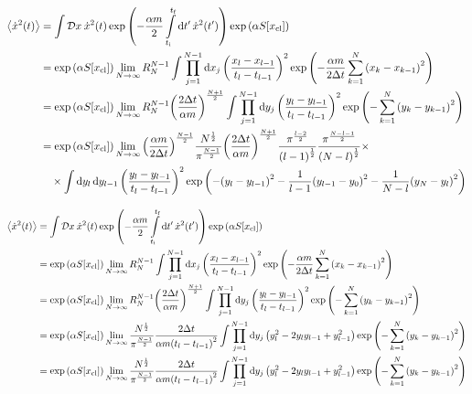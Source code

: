 \documentclass[twoside]{amsart}
\newcommand{\Dd}[1]{\mathcal D #1\: }
\numberwithin{equation}{section}
\begin{document}
\begin{align*}
    \expval{\dot x^2\qty(t)}&=\int\Dd x\dot x^2\qty(t)\exp\qty(-\frac{\alpha m}{2}\int\limits_{t_{\textnormal i}}^{t_{\textnormal f}}\dd{t'}\dot x^2\qty(t'))\exp\qty(\alpha S\qty[x_{\textnormal{cl}}])\\
    &=\exp\qty(\alpha S\qty[x_{\textnormal{cl}}])\lim\limits_{N\rightarrow\infty}R_N^{N-1}\int\prod\limits_{j=1}^{N-1}\dd{x_j}\qty(\frac{x_l-x_{l-1}}{t_l-t_{l-1}})^2\exp\qty(-\frac{\alpha m}{2\Delta t}\sum\limits_{k=1}^N\qty(x_k-x_{k-1})^2)\\
    &=\exp\qty(\alpha S\qty[x_{\textnormal{cl}}])\lim\limits_{N\rightarrow\infty}R_N^{N-1}\qty(\frac{2\Delta t}{\alpha m})^{\frac {N+1}{2}}\int\prod\limits_{j=1}^{N-1}\dd{y_j}\qty(\frac{y_l-y_{l-1}}{t_l-t_{l-1}})^2\exp\qty(-\sum\limits_{k=1}^N\qty(y_k-y_{k-1})^2)\\
    &=\exp\qty(\alpha S\qty[x_{\textnormal{cl}}])\lim\limits_{N\rightarrow\infty}\qty(\frac{\alpha m}{2\Delta t})^{\frac{N-1}{2}}\frac{N^{\frac{1}{2}}}{\pi^{\frac{N-1}{2}}}\qty(\frac{2\Delta t}{\alpha m})^{\frac {N+1}{2}}\frac{\pi^{\frac{l-2}{2}}}{\qty(l-1)^{\frac12}}\frac{\pi^{\frac{N-l-1}{2}}}{\qty(N-l)^{\frac12}}\times\\
    &\quad\times\int\dd{y_l}\dd{y_{l-1}}\qty(\frac{y_l-y_{l-1}}{t_l-t_{l-1}})^2\exp\qty(-\qty(y_l-y_{l-1})^2-\frac{1}{l-1}\qty(y_{l-1}-y_0)^2-\frac{1}{N-l}\qty(y_N-y_l)^2)
\end{align*}

\begin{align*}
    \expval{\dot x^2\qty(t)}&=\int\Dd x\dot x^2\qty(t)\exp\qty(-\frac{\alpha m}{2}\int\limits_{t_{\textnormal i}}^{t_{\textnormal f}}\dd{t'}\dot x^2\qty(t'))\exp\qty(\alpha S\qty[x_{\textnormal{cl}}])\\
    &=\exp\qty(\alpha S\qty[x_{\textnormal{cl}}])\lim\limits_{N\rightarrow\infty}R_N^{N-1}\int\prod\limits_{j=1}^{N-1}\dd{x_j}\qty(\frac{x_l-x_{l-1}}{t_l-t_{l-1}})^2\exp\qty(-\frac{\alpha m}{2\Delta t}\sum\limits_{k=1}^N\qty(x_k-x_{k-1})^2)\\
    &=\exp\qty(\alpha S\qty[x_{\textnormal{cl}}])\lim\limits_{N\rightarrow\infty}R_N^{N-1}\qty(\frac{2\Delta t}{\alpha m})^{\frac {N+1}{2}}\int\prod\limits_{j=1}^{N-1}\dd{y_j}\qty(\frac{y_l-y_{l-1}}{t_l-t_{l-1}})^2\exp\qty(-\sum\limits_{k=1}^N\qty(y_k-y_{k-1})^2)\\
    &=\exp\qty(\alpha S\qty[x_{\textnormal{cl}}])\lim\limits_{N\rightarrow\infty}\frac{N^{\frac{1}{2}}}{\pi^{\frac{N-1}{2}}}\frac{2\Delta t}{\alpha m\qty(t_l-t_{l-1})^2}\int\prod\limits_{j=1}^{N-1}\dd{y_j}\qty(y_l^2-2y_ly_{l-1}+y_{l-1}^2)\exp\qty(-\sum\limits_{k=1}^N\qty(y_k-y_{k-1})^2)\\
    &=\exp\qty(\alpha S\qty[x_{\textnormal{cl}}])\lim\limits_{N\rightarrow\infty}\frac{N^{\frac{1}{2}}}{\pi^{\frac{N-1}{2}}}\frac{2\Delta t}{\alpha m\qty(t_l-t_{l-1})^2}\int\prod\limits_{j=1}^{N-1}\dd{y_j}\qty(y_l^2-2y_ly_{l-1}+y_{l-1}^2)\exp\qty(-\sum\limits_{k=1}^N\qty(y_k-y_{k-1})^2)
\end{align*}

  
  
\end{document}
